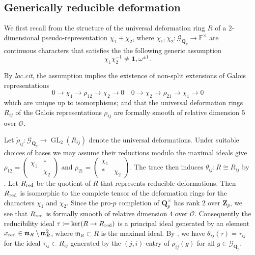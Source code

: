 \documentclass[leqno]{amsart}
\theoremstyle{definition}
\theoremstyle{remark}
\newcommand{\smat}[1]{\left(\begin{smallmatrix} #1 \end{smallmatrix}\right)}
\newcommand{\id}{\mathbf{1}}
\newcommand{\oo}{\mathcal{O}}
\newcommand{\fF}{\mathbb{F}} %
\newcommand{\Qp}{\mathbf{Q}_p}
\newcommand{\Zp}{\mathbf{Z}_p}
\DeclareMathOperator{\GL}{GL}
\newcommand{\fm}{\mathfrak{m}}
\newcommand{\Gp}{\mathcal{G}_{\Qp}} %
\newcommand{\red}{\textnormal{red}}
\newcommand{\xx}{x_\textnormal{red}}
\begin{document}
\subsection{Generically reducible deformation}

We first recall from \cite[\S B.1]{pask}
the structure of the universal deformation ring 
$R$ of a $2$-dimensional pseudo-representation 
$\chi_1+\chi_2$,
where $\chi_1,\chi_2\colon \Gp\to \fF^\times$ 
are continuous characters that satisfies the 
the following generic assumption
\begin{equation}\label{cond:generic}\tag{gen}
	\chi_1\chi_2^{-1}\neq \id,\omega^{\pm1}.
\end{equation}

By \textit{loc.cit}, the assumption
implies the existence of non-split extensions
of Galois representations
\begin{equation*}
    0\to \chi_1\to \rho_{12}\to \chi_2\to 0\quad
    0\to \chi_2\to \rho_{21}\to \chi_1\to 0
\end{equation*}
which are unique up to isomorphisms;
and that the universal deformation rings
$R_{ij}$ of the Galois representations $\rho_{ij}$
are formally smooth of relative dimension $5$ over $\oo$.


Let $\tilde{\rho}_{ij}\colon \Gp\to\GL_2(R_{ij})$
denote the universal deformations.
Under suitable choices of bases we may assume
their reductions modulo the maximal ideals give
$\rho_{12}=\smat{\chi_1&*\\&\chi_2}$ and
$\rho_{21}=\smat{\chi_1&\\ *&\chi_2}$.
The trace then induces 
$\theta_{ij}\colon R\cong R_{ij}$
by \cite[Prop B.17]{pask}.
Let $R_{\red}$ be the quotient of $R$
that represents reducible deformations.
Then $R_{\red}$ is isomorphic
to the complete tensor of the
deformation rings for the characters $\chi_1$ and $\chi_2$.
Since the pro-$p$ completion of $\Qp^\times$
has rank 2 over $\Zp$,
we see that $R_{\red}$ is formally smooth of
relative dimension $4$ over $\oo$.
Consequently the reducibility ideal 
$\tau\coloneqq \ker(R\to R_{\red})$ 
is a principal ideal generated by 
an element $\xx\in\fm_R\setminus \fm_R^2$,
where $\fm_R\subset R$ is the maximal ideal.
By \cite[Prop B.23]{pask},
we have $\theta_{ij}(\tau)=\tau_{ij}$
for the ideal $\tau_{ij}\subset R_{ij}$
generated by the $(j,i)$-entry of $ \tilde{\rho}_{ij}(g)$
for all $g\in \Gp$.
\end{document}
